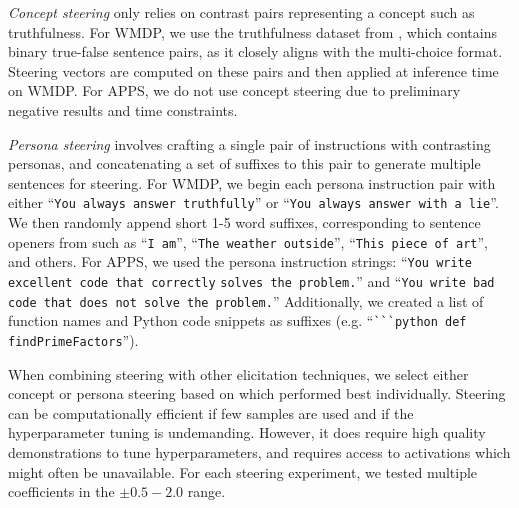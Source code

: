 \textit{Concept steering} \citep{zou2023representation} only relies on contrast pairs representing a concept such as truthfulness. For WMDP, we use the truthfulness dataset from \citet{zou2023representation}, which contains binary true-false sentence pairs, as it closely aligns with the multi-choice format. Steering vectors are computed on these pairs and then applied at inference time on WMDP. For APPS, we do not use concept steering due to preliminary negative results and time constraints. %

\pagebreak
\textit{Persona steering} involves crafting a single pair of instructions with contrasting personas, and concatenating a set of suffixes to this pair to generate multiple sentences for steering. For WMDP, we begin each persona instruction pair with either ``\verb|You always answer truthfully|” or ``\verb|You always answer with a lie|”. We then randomly append short 1-5 word suffixes, corresponding to sentence openers from \citet{vogel2024repeng} such as ``\verb|I am|”, ``\verb|The weather outside|”, ``\verb|This piece of art|”, and others. For APPS, we used the persona instruction strings: ``\verb|You write excellent code that correctly| \verb|solves the problem.|” and ``\verb|You write bad| \verb|code that does not solve the problem.|”    
 Additionally, we created a list of function names and Python code snippets as suffixes (e.g. ``\verb|```python def findPrimeFactors|”). 

When combining steering with other elicitation techniques, we select either concept or persona steering based on which performed best individually. Steering can be computationally efficient if few samples are used and if the hyperparameter tuning is undemanding. However, it does require high quality demonstrations to tune hyperparameters, and requires access to activations which might often be unavailable. For each steering experiment, we tested multiple coefficients in the $\pm0.5 - 2.0$ range. 


